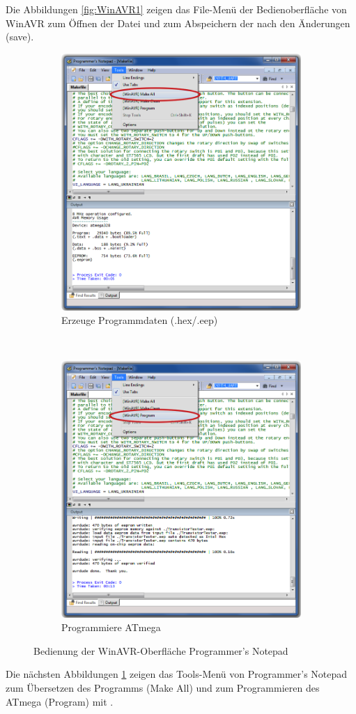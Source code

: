 Die Abbildungen \ref{fig:WinAVR1} zeigen das File-Menü der Bedienoberfläche von WinAVR zum
Öffnen der Datei  und zum Abspeichern der  nach den Änderungen (save).
\begin{figure}[H]
  \begin{subfigure}[b]{.5\textwidth}
    \centering
    \includegraphics[width=.85\textwidth]{../PNG/Notepad_make.png}
    \caption{Erzeuge Programmdaten (.hex/.eep)}
  \end{subfigure}
  ~
  \begin{subfigure}[b]{.5\textwidth}
    \centering
    \includegraphics[width=.85\textwidth]{../PNG/Notepad_program.png}
    \caption{Programmiere ATmega}
  \end{subfigure}
  \caption{Bedienung der WinAVR-Oberfläche Programmer's Notepad}
  \label{fig:WinAVR2}
\end{figure}
Die nächsten Abbildungen \ref{fig:WinAVR2} zeigen das Tools-Menü von Programmer's Notepad
zum Übersetzen des Programms (Make All) und zum Programmieren des ATmega (Program) mit .
